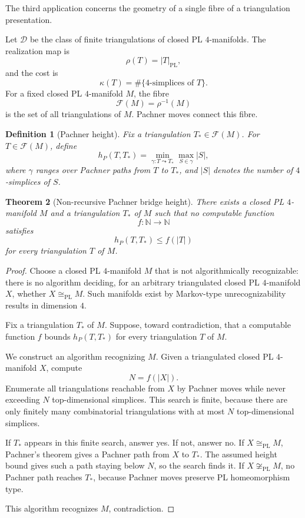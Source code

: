 \documentclass[11pt]{article}
\newtheorem{theorem}{Theorem}[section]
\newtheorem{definition}[theorem]{Definition}
\begin{document}
The third application concerns the geometry of a single fibre of a triangulation presentation.

Let \(\mathcal D\) be the class of finite triangulations of closed PL \(4\)-manifolds. The realization map is
\[
\rho(T)=|T|_{\mathrm{PL}},
\]
and the cost is
\[
\kappa(T)=\#\{\text{\(4\)-simplices of }T\}.
\]
For a fixed closed PL \(4\)-manifold \(M\), the fibre
\[
\mathcal F(M)=\rho^{-1}(M)
\]
is the set of all triangulations of \(M\). Pachner moves connect this fibre.

\begin{definition}[Pachner height]
Fix a triangulation \(T_\ast\in\mathcal F(M)\). For \(T\in\mathcal F(M)\), define
\[
h_P(T,T_\ast)
=
\min_{\gamma:T\leadsto T_\ast}
\max_{S\in\gamma}|S|,
\]
where \(\gamma\) ranges over Pachner paths from \(T\) to \(T_\ast\), and \(|S|\) denotes the number of \(4\)-simplices of \(S\).
\end{definition}

\begin{theorem}[Non-recursive Pachner bridge height]
There exists a closed PL \(4\)-manifold \(M\) and a triangulation \(T_\ast\) of \(M\) such that no computable function
\[
f:\mathbb N\to\mathbb N
\]
satisfies
\[
h_P(T,T_\ast)\leq f(|T|)
\]
for every triangulation \(T\) of \(M\).
\end{theorem}

\begin{proof}
Choose a closed PL \(4\)-manifold \(M\) that is not algorithmically recognizable: there is no algorithm deciding, for an arbitrary triangulated closed PL \(4\)-manifold \(X\), whether \(X\cong_{\mathrm{PL}}M\). Such manifolds exist by Markov-type unrecognizability results in dimension \(4\).

Fix a triangulation \(T_\ast\) of \(M\). Suppose, toward contradiction, that a computable function \(f\) bounds \(h_P(T,T_\ast)\) for every triangulation \(T\) of \(M\).

We construct an algorithm recognizing \(M\). Given a triangulated closed PL \(4\)-manifold \(X\), compute
\[
N=f(|X|).
\]
Enumerate all triangulations reachable from \(X\) by Pachner moves while never exceeding \(N\) top-dimensional simplices. This search is finite, because there are only finitely many combinatorial triangulations with at most \(N\) top-dimensional simplices.

If \(T_\ast\) appears in this finite search, answer yes. If not, answer no. If \(X\cong_{\mathrm{PL}}M\), Pachner's theorem gives a Pachner path from \(X\) to \(T_\ast\). The assumed height bound gives such a path staying below \(N\), so the search finds it. If \(X\not\cong_{\mathrm{PL}}M\), no Pachner path reaches \(T_\ast\), because Pachner moves preserve PL homeomorphism type.

This algorithm recognizes \(M\), contradiction.
\end{proof}
\end{document}
